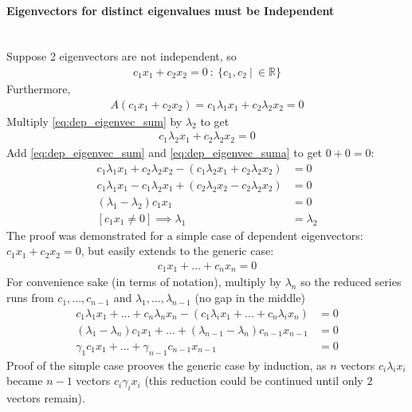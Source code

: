 \documentclass{article}
\newcommand{\myparagraph}[1]{\paragraph{#1}\mbox{}\\}
\begin{document}
\myparagraph{Eigenvectors for distinct eigenvalues must be Independent}{
  Suppose 2 eigenvectors are not independent, so
  \begin{align}
    \label{eq:dep_eigenvec_sum}
    c_1x_1+c_2x_2=0~:~\{c_1,c_2~|~\in \mathbb{R}\}
  \end{align}
  Furthermore,
  \begin{align}
    A(c_1x_1+c_2x_2)=c_1\lambda_1 x_1+c_2\lambda_2 x_2=0
  \end{align}
  Multiply \ref{eq:dep_eigenvec_sum} by $\lambda_2$ to get
  \begin{align*}
    \label{eq:dep_eigenvec_suma}
    c_1\lambda_2x_1+c_2\lambda_2x_2=0
  \end{align*}
  Add \ref{eq:dep_eigenvec_sum} and \ref{eq:dep_eigenvec_suma} to get $0+0=0$:
  \begin{align*}
    c_1\lambda_1 x_1+c_2\lambda_2 x_2-(c_1\lambda_2 x_1+c_2\lambda_2 x_2)&=0\\
    c_1\lambda_1 x_1-c_1\lambda_2 x_1+(c_2\lambda_2 x_2-c_2\lambda_2 x_2)&=0\\
    (\lambda_1-\lambda_2)c_1x_1&=0\\
    [c_1x_1 \neq 0] \implies \lambda_1&=\lambda_2
  \end{align*}
  The proof was demonstrated for a simple case of dependent eigenvectors:\newline
  $c_1x_1+c_2x_2=0$, but easily extends to the generic case:
  \begin{align*}
    c_1x_1+...+c_nx_n=0
  \end{align*}
  For convenience sake (in terms of notation), multiply by $\lambda_n$ so the reduced series
  runs from $c_1,...,c_{n-1}$ and $\lambda_1,...,\lambda_{n-1}$ (no gap in the middle)
  \begin{align*}
    c_1\lambda_1 x_1+...+c_n\lambda_n x_n-(c_1\lambda_i x_1+...+c_n\lambda_i x_n)&=0\\
    (\lambda_1-\lambda_n)c_1 x_1+...+(\lambda_{n-1}-\lambda_n)c_{n-1} x_{n-1}&=0\\
    \gamma_1c_1 x_1+...+\gamma_{n-1}c_{n-1} x_{n-1}&=0
  \end{align*}
  Proof of the simple case prooves the generic case by induction, as $n$ vectors $c_i\lambda_i x_i$
  became $n-1$ vectors $c_i\gamma_i x_i$ (this reduction could be continued until only $2$ vectors remain).
}
\end{document}
